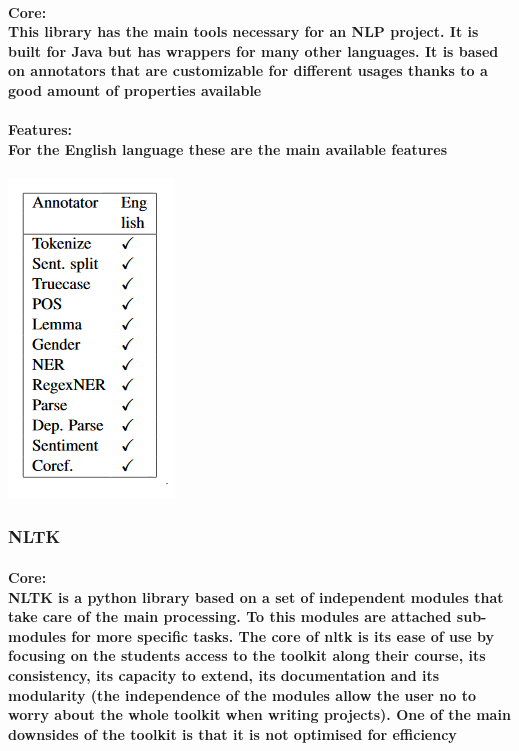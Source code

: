 \documentclass[12pt,journal,compsoc]{IEEEtran}
\begin{document}
\paragraph{Core: \\This library has the main tools necessary for an NLP project. It is built for Java but has wrappers for many other languages. It is based on annotators that are customizable for different usages thanks to a good amount of properties available\cite{Standford}}
\paragraph{Features: \\For the English language these are the main available features}
\begin{center}
\includegraphics[scale=0.35]{stdford.png} 
\end{center}
\subsubsection{NLTK}
\paragraph{Core:\\ NLTK is a python library based on a set of independent modules that take care of the main processing. To this modules are attached sub-modules for more specific tasks. The core of nltk is its ease of use by focusing on the students access to the toolkit along their course, its consistency, its capacity to extend, its documentation and its modularity (the independence of the modules allow the user no to worry about the whole toolkit when writing projects). One of the main downsides of the toolkit is that it is not optimised for efficiency\cite{nltk}} 
\end{document}

